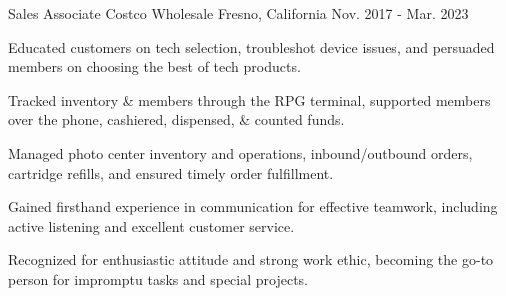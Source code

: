 \begin{cventries}
  \cventry
    {Sales Associate} %
    {Costco Wholesale} %
    {Fresno, California} %
    {Nov. 2017 - Mar. 2023} %
    {
      \begin{cvitems} %
	  \item {Educated customers on tech selection, troubleshot device issues, and persuaded members on choosing the best of tech products.}
	  \item {Tracked inventory \& members through the RPG terminal, supported members over the phone, cashiered, dispensed, \& counted funds.}
	  \item {Managed photo center inventory and operations, inbound/outbound orders, cartridge refills, and ensured timely order fulfillment.}
	  \item {Gained firsthand experience in communication for effective teamwork, including active listening and excellent customer service.}
	  \item {Recognized for enthusiastic attitude and strong work ethic, becoming the go-to person for impromptu tasks and special projects.} 
	  \end{cvitems}
	 }

\end{cventries}
